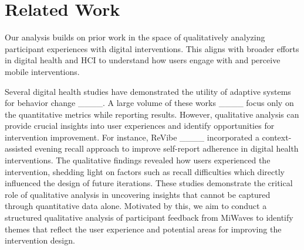 \section{Related Work}
\label{sec:related_work}
Our analysis builds on prior work in the space of qualitatively analyzing participant experiences with digital interventions. This aligns with broader efforts in digital health and HCI to understand how users engage with and perceive mobile interventions.

Several digital health studies have demonstrated the utility of adaptive systems for behavior change ____. 
A large volume of these works ____ focus only on the quantitative metrics while reporting results. 
However, qualitative analysis can provide crucial insights into user experiences and identify opportunities for intervention improvement. 
For instance, ReVibe ____ incorporated a context-assisted evening recall approach to improve self-report adherence in digital health interventions. The qualitative findings revealed how users experienced the intervention, shedding light on factors such as recall difficulties which directly influenced the design of future iterations. These studies demonstrate the critical role of qualitative analysis in uncovering insights that cannot be captured through quantitative data alone. Motivated by this, we aim to conduct a structured qualitative analysis of participant feedback from MiWaves to identify themes that reflect the user experience and potential areas for improving the intervention design.

